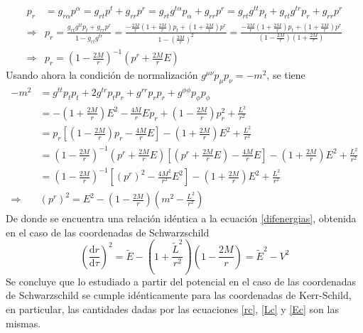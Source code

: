 \documentclass[11pt,twoside,openright,spanish]{report}
\numberwithin{equation}{chapter}
\numberwithin{figure}{chapter}
\numberwithin{table}{chapter}
\begin{document}
\begin{align*}
p_r&=g_{r\alpha}p^\alpha=g_{rt}p^t+g_{rr}p^r=g_{rt}g^{t\alpha}p_\alpha+g_{rr}p^r=g_{rt}g^{tt}p_t+g_{rt}g^{tr}p_r+g_{rr}p^r\\
\Rightarrow& p_r=\frac{g_{rt}g^{tt}p_t+g_{rr}p^{r}}{1-g_{rt}g^{tr}}=\frac{-\frac{2M}{r}\left(1+\frac{2M}{r}\right)p_t+\left(1+\frac{2M}{r}\right)p^r}{1-\left(\frac{2M}{r}\right)^2}=\frac{-\frac{2M}{r}\left(1+\frac{2M}{r}\right)p_t+\left(1+\frac{2M}{r}\right)p^r}{\left(1-\frac{2M}{r}\right)\left(1+\frac{2M}{r}\right)}\\
\Rightarrow& p_r=\left(1-\frac{2M}{r}\right)^{-1}\left(p^r+\frac{2M}{r}E\right)
\end{align*}
Usando ahora la condición de normalización $g^{\mu\nu}p_\mu p_\nu=-m^2$, se tiene
\begin{align*}
-m^2&=g^{tt}p_tp_t+2g^{tr}p_tp_r+g^{rr}p_rp_r+g^{\phi\phi}p_\phi p_\phi\\
&=-\left(1+\frac{2M}{r}\right)E^2-\frac{4M}{r}Ep_r+\left(1-\frac{2M}{r}\right)p_r^2+\frac{L^2}{r^2}\\
&=p_r\left[\left(1-\frac{2M}{r}\right)p_r-\frac{4M}{r}E\right]-\left(1+\frac{2M}{r}\right)E^2+\frac{L^2}{r^2}\\
&=\left(1-\frac{2M}{r}\right)^{-1}\left(p^r+\frac{2M}{r}E\right)\left[\left(p^r+\frac{2M}{r}E\right)-\frac{4M}{r}E\right]-\left(1+\frac{2M}{r}\right)E^2+\frac{L^2}{r^2}\\
&=\left(1-\frac{2M}{r}\right)^{-1}\left[\left(p^r\right)^2-\frac{4M^2}{r^2}E^2\right]-\left(1+\frac{2M}{r}\right)E^2+\frac{L^2}{r^2}\\
\Rightarrow&\left(p^r\right)^2=E^2-\left(1-\frac{2M}{r}\right)\left(m^2-\frac{L^2}{r^2}\right)
\end{align*}
De donde se encuentra una relación idéntica a la ecuación \eqref{difenergias}, obtenida en el caso de las coordenadas de Schwarzschild 
\begin{equation}
\left(\frac{\text{d}r}{\text{d}\tau}\right)^2=\tilde{E}-\left(1+\frac{\tilde{L}^2}{r^2}\right)\left(1-\frac{2M}{r}\right)=\tilde{E}^2-V^2
\end{equation}
Se concluye que lo estudiado a partir del potencial en el caso de las coordenadas de Schwarzschild se cumple idénticamente para las coordenadas de Kerr-Schild, en particular, las cantidades dadas por las ecuaciones \eqref{rc}, \eqref{Lc} y \eqref{Ec} son las mismas.
\end{document}
